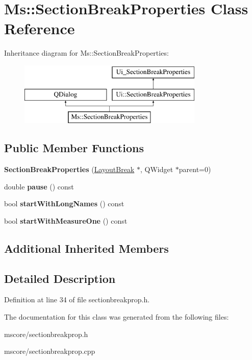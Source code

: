 \hypertarget{class_ms_1_1_section_break_properties}{}\section{Ms\+:\+:Section\+Break\+Properties Class Reference}
\label{class_ms_1_1_section_break_properties}
Inheritance diagram for Ms\+:\+:Section\+Break\+Properties\+:\begin{figure}[H]
\begin{center}
\leavevmode
\includegraphics[height=3.000000cm]{class_ms_1_1_section_break_properties}
\end{center}
\end{figure}
\subsection*{Public Member Functions}
\begin{DoxyCompactItemize}
\item 
\mbox{\label{class_ms_1_1_section_break_properties_ab813784c1e914125816f6ae080cc6aa9}} 
{\bfseries Section\+Break\+Properties} (\hyperlink{class_ms_1_1_layout_break}{Layout\+Break} $\ast$, Q\+Widget $\ast$parent=0)
\item 
\mbox{\label{class_ms_1_1_section_break_properties_a95f1c34fbb75c51a629d995d01e899ca}} 
double {\bfseries pause} () const
\item 
\mbox{\label{class_ms_1_1_section_break_properties_a9923f3b2c6579c832c9c1fedf98ce78f}} 
bool {\bfseries start\+With\+Long\+Names} () const
\item 
\mbox{\label{class_ms_1_1_section_break_properties_aaa46fc9e43081df7f73ba6f71af999ea}} 
bool {\bfseries start\+With\+Measure\+One} () const
\end{DoxyCompactItemize}
\subsection*{Additional Inherited Members}


\subsection{Detailed Description}


Definition at line 34 of file sectionbreakprop.\+h.



The documentation for this class was generated from the following files\+:\begin{DoxyCompactItemize}
\item 
mscore/sectionbreakprop.\+h\item 
mscore/sectionbreakprop.\+cpp\end{DoxyCompactItemize}

